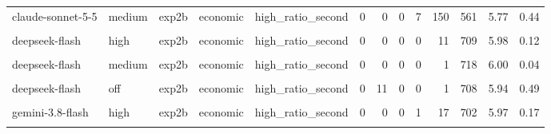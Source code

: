 \documentclass[
]{article}
\begin{document}
\begin{table}[!h]
{\begin{tabular}[t]{lllllrrrrrrrr}
claude-sonnet-5-5 & medium & exp2b & economic & high\_ratio\_second & 0 & 0 & 0 & 7 & 150 & 561 & 5.77 & 0.44\\
\cellcolor{gray!10}{deepseek-flash} & \cellcolor{gray!10}{high} & \cellcolor{gray!10}{exp2b} & \cellcolor{gray!10}{economic} & \cellcolor{gray!10}{high\_ratio\_first} & \cellcolor{gray!10}{0} & \cellcolor{gray!10}{0} & \cellcolor{gray!10}{0} & \cellcolor{gray!10}{0} & \cellcolor{gray!10}{0} & \cellcolor{gray!10}{720} & \cellcolor{gray!10}{6.00} & \cellcolor{gray!10}{0.00}\\
deepseek-flash & high & exp2b & economic & high\_ratio\_second & 0 & 0 & 0 & 0 & 11 & 709 & 5.98 & 0.12\\
\addlinespace
\cellcolor{gray!10}{deepseek-flash} & \cellcolor{gray!10}{medium} & \cellcolor{gray!10}{exp2b} & \cellcolor{gray!10}{economic} & \cellcolor{gray!10}{high\_ratio\_first} & \cellcolor{gray!10}{0} & \cellcolor{gray!10}{0} & \cellcolor{gray!10}{0} & \cellcolor{gray!10}{0} & \cellcolor{gray!10}{2} & \cellcolor{gray!10}{718} & \cellcolor{gray!10}{6.00} & \cellcolor{gray!10}{0.05}\\
deepseek-flash & medium & exp2b & economic & high\_ratio\_second & 0 & 0 & 0 & 0 & 1 & 718 & 6.00 & 0.04\\
\cellcolor{gray!10}{deepseek-flash} & \cellcolor{gray!10}{off} & \cellcolor{gray!10}{exp2b} & \cellcolor{gray!10}{economic} & \cellcolor{gray!10}{high\_ratio\_first} & \cellcolor{gray!10}{0} & \cellcolor{gray!10}{37} & \cellcolor{gray!10}{0} & \cellcolor{gray!10}{0} & \cellcolor{gray!10}{0} & \cellcolor{gray!10}{683} & \cellcolor{gray!10}{5.79} & \cellcolor{gray!10}{0.88}\\
deepseek-flash & off & exp2b & economic & high\_ratio\_second & 0 & 11 & 0 & 0 & 1 & 708 & 5.94 & 0.49\\
\cellcolor{gray!10}{gemini-3.8-flash} & \cellcolor{gray!10}{high} & \cellcolor{gray!10}{exp2b} & \cellcolor{gray!10}{economic} & \cellcolor{gray!10}{high\_ratio\_first} & \cellcolor{gray!10}{0} & \cellcolor{gray!10}{0} & \cellcolor{gray!10}{0} & \cellcolor{gray!10}{0} & \cellcolor{gray!10}{31} & \cellcolor{gray!10}{689} & \cellcolor{gray!10}{5.96} & \cellcolor{gray!10}{0.20}\\
\addlinespace
gemini-3.8-flash & high & exp2b & economic & high\_ratio\_second & 0 & 0 & 0 & 1 & 17 & 702 & 5.97 & 0.17\\
\cellcolor{gray!10}{gemini-3.8-flash} & \cellcolor{gray!10}{low} & \cellcolor{gray!10}{exp2b} & \cellcolor{gray!10}{economic} & \cellcolor{gray!10}{high\_ratio\_first} & \cellcolor{gray!10}{0} & \cellcolor{gray!10}{0} & \cellcolor{gray!10}{0} & \cellcolor{gray!10}{0} & \cellcolor{gray!10}{22} & \cellcolor{gray!10}{698} & \cellcolor{gray!10}{5.97} & \cellcolor{gray!10}{0.17}\\

\end{tabular}}
\end{table}
\end{document}
